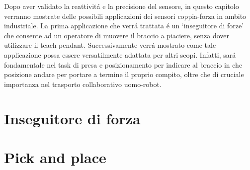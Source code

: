 Dopo aver validato la reattivit\'{a} e la precisione del sensore, in questo capitolo verranno mostrate delle possibili applicazioni 
dei sensori coppia-forza in ambito industriale. 
La prima applicazione che verr\'{a} trattata \'{e} un `inseguitore di forze' che consente ad un operatore di muovere il braccio 
a piaciere, senza dover utilizzare 
il teach pendant. Successivamente verr\'{a} mostrato come tale applicazione possa essere versatilmente adattata per altri scopi. 
Infatti, sar\'{a} fondamentale nel task di presa e posizionamento per indicare al braccio in che posizione andare per 
portare a termine il proprio compito, oltre che di cruciale importanza nel trasporto collaborativo uomo-robot. 

\section{Inseguitore di forza}


\section{Pick and place}

